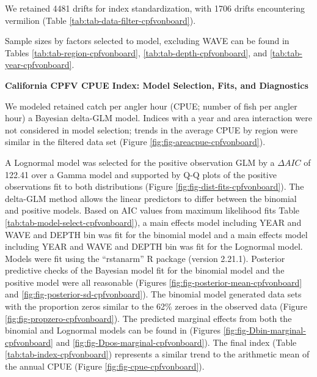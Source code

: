 \documentclass[11pt,
  english,
  a4paper,
]{article}
\begin{document}
We retained 4481 drifts for index standardization, with 1706 drifts encountering vermilion (Table \ref{tab:tab-data-filter-cpfvonboard}).

Sample sizes by factors selected to model, excluding WAVE can be found in Tables \ref{tab:tab-region-cpfvonboard}, \ref{tab:tab-depth-cpfvonboard}, and \ref{tab:tab-year-cpfvonboard}.

\textbf{California CPFV CPUE Index: Model Selection, Fits, and Diagnostics}

We modeled retained catch per angler hour (CPUE; number of fish per angler hour) a Bayesian delta-GLM model. Indices with a year and area interaction were not considered in model selection; trends in the average CPUE by region were similar in the filtered data set (Figure \ref{fig:fig-areacpue-cpfvonboard}).

A Lognormal model was selected for the positive observation GLM by a {\(\Delta AIC\)\leavevmode\tagmcend\tagstructend} of 122.41 over a Gamma model and supported by Q-Q plots of the positive observations fit to both distributions (Figure \ref{fig:fig-dist-fits-cpfvonboard}). The delta-GLM method allows the linear predictors to differ between the binomial and positive models. Based on AIC values from maximum likelihood fits Table \ref{tab:tab-model-select-cpfvonboard}), a main effects model including YEAR and WAVE and DEPTH bin was fit for the binomial model and a main effects model including YEAR and WAVE and DEPTH bin was fit for the Lognormal model. Models were fit using the ``rstanarm'' R package (version 2.21.1). Posterior predictive checks of the Bayesian model fit for the binomial model and the positive model were all reasonable (Figures \ref{fig:fig-posterior-mean-cpfvonboard} and \ref{fig:fig-posterior-sd-cpfvonboard}). The binomial model generated data sets with the proportion zeros similar to the 62\% zeroes in the observed data (Figure \ref{fig:fig-propzero-cpfvonboard}). The predicted marginal effects from both the binomial and Lognormal models can be found in (Figures \ref{fig:fig-Dbin-marginal-cpfvonboard} and \ref{fig:fig-Dpos-marginal-cpfvonboard}). The final index (Table \ref{tab:tab-index-cpfvonboard}) represents a similar trend to the arithmetic mean of the annual CPUE (Figure \ref{fig:fig-cpue-cpfvonboard}).

\newpage
\end{document}
